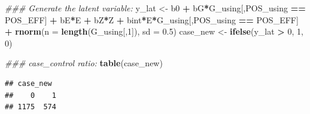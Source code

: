 \documentclass[
]{article}
\newenvironment{Shaded}{\begin{snugshade}}{\end{snugshade}}
\newcommand{\CommentTok}[1]{\textcolor[rgb]{0.56,0.35,0.01}{\textit{#1}}}
\newcommand{\DataTypeTok}[1]{\textcolor[rgb]{0.13,0.29,0.53}{#1}}
\newcommand{\DecValTok}[1]{\textcolor[rgb]{0.00,0.00,0.81}{#1}}
\newcommand{\FloatTok}[1]{\textcolor[rgb]{0.00,0.00,0.81}{#1}}
\newcommand{\KeywordTok}[1]{\textcolor[rgb]{0.13,0.29,0.53}{\textbf{#1}}}
\newcommand{\NormalTok}[1]{#1}
\newcommand{\OperatorTok}[1]{\textcolor[rgb]{0.81,0.36,0.00}{\textbf{#1}}}
\newcommand{\StringTok}[1]{\textcolor[rgb]{0.31,0.60,0.02}{#1}}
\begin{document}
\begin{Shaded}
\begin{Highlighting}[]
\CommentTok{### Generate the latent variable:}
\NormalTok{y_lat <-}\StringTok{ }\NormalTok{b0 }\OperatorTok{+}\StringTok{ }\NormalTok{bG}\OperatorTok{*}\NormalTok{G_using[,POS_using }\OperatorTok{==}\StringTok{ }\NormalTok{POS_EFF] }\OperatorTok{+}\StringTok{ }\NormalTok{bE}\OperatorTok{*}\NormalTok{E }\OperatorTok{+}\StringTok{ }\NormalTok{bZ}\OperatorTok{*}\NormalTok{Z }\OperatorTok{+}\StringTok{ }\NormalTok{bint}\OperatorTok{*}\NormalTok{E}\OperatorTok{*}\NormalTok{G_using[,POS_using }\OperatorTok{==}\StringTok{ }\NormalTok{POS_EFF] }\OperatorTok{+}\StringTok{ }\KeywordTok{rnorm}\NormalTok{(}\DataTypeTok{n =} \KeywordTok{length}\NormalTok{(G_using[,}\DecValTok{1}\NormalTok{]), }\DataTypeTok{sd =} \FloatTok{0.5}\NormalTok{)}
\NormalTok{case_new <-}\StringTok{ }\KeywordTok{ifelse}\NormalTok{(y_lat }\OperatorTok{>}\StringTok{ }\DecValTok{0}\NormalTok{, }\DecValTok{1}\NormalTok{, }\DecValTok{0}\NormalTok{)}

\CommentTok{### case_control ratio: }
\KeywordTok{table}\NormalTok{(case_new)}
\end{Highlighting}
\end{Shaded}

\begin{verbatim}
## case_new
##    0    1 
## 1175  574
\end{verbatim}
\end{document}

